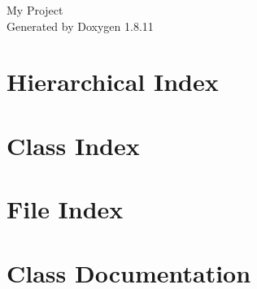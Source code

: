 \documentclass[twoside]{book}
\newcommand{\+}{\discretionary{\mbox{\scriptsize$\hookleftarrow$}}{}{}}
\newcommand{\clearemptydoublepage}{%
  \newpage{\pagestyle{empty}\cleardoublepage}%
}
\begin{document}
\hypersetup{pageanchor=false,
             bookmarksnumbered=true,
             pdfencoding=unicode
            }
\begin{titlepage}
\vspace*{7cm}
\begin{center}%
{\Large My Project }\\
\vspace*{1cm}
{\large Generated by Doxygen 1.8.11}\\
\end{center}
\end{titlepage}
\clearemptydoublepage
\tableofcontents
\clearemptydoublepage
{}
\hypersetup{pageanchor=true}

\chapter{Hierarchical Index}

\chapter{Class Index}

\chapter{File Index}

\chapter{Class Documentation}














































\end{document}
